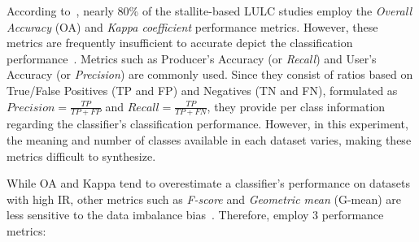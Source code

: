\documentclass[parskip=full]{scrartcl}
\begin{document}
According to~\cite{Gavade2019}, nearly 80\% of the stallite-based LULC studies
employ the \textit{Overall Accuracy} (OA) and \textit{Kappa coefficient}
performance metrics. However, these metrics are frequently insufficient to
accurate depict the classification performance~\cite{Olofsson2013, Pontius2011}.
Metrics such as Producer's Accuracy (or \textit{Recall}) and User's Accuracy (or
\textit{Precision}) are commonly used. Since they consist of ratios based on
True/False Positives (TP and FP) and Negatives (TN and FN), formulated as
$Precision = \frac{TP}{TP+FP}$ and $Recall = \frac{TP}{TP+FN}$, they provide per
class information regarding the classifier's classification performance.
However, in this experiment, the meaning and number of classes available in each
dataset varies, making these metrics difficult to synthesize.

While OA and Kappa tend to overestimate a classifier's performance on datasets
with high IR, other metrics such as \textit{F-score} and \textit{Geometric mean}
(G-mean) are less sensitive to the data imbalance bias~\cite{Jeni2013,
Kubat1997}. Therefore, employ 3 performance metrics:
\end{document}

